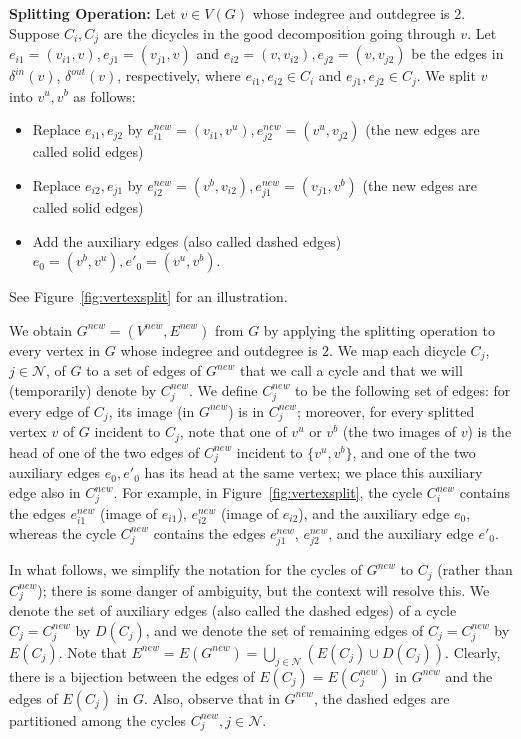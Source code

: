 \documentclass[11pt]{article}
\newcommand{\cindset}{\mathcal{N}}
\begin{document}
\textbf{Splitting Operation:} Let  $v\in V(G)$ whose indegree and
outdegree is $2$. Suppose $C_i, C_j$ are the dicycles in the
good decomposition going through $v$. Let $e_{i1}=(v_{i1}, v),
e_{j1}=(v_{j1}, v)$ and $e_{i2}=(v, v_{i2}), e_{j2}=(v, v_{j2})$
be the edges in $\delta^{in}(v)$, $\delta^{out}(v)$, respectively,
where $e_{i1}, e_{i2}\in C_i$ and $e_{j1}, e_{j2}\in C_j$.  We split
$v$ into $v^{u}, v^{b}$ as follows:

\begin{itemize}
\item Replace $e_{i1}, e_{j2}$ by $e_{i1}^{new}=(v_{i1},v^{u}),
	e_{j2}^{new}=(v^{u}, v_{j2})$ (the new edges are called solid edges)
\item Replace $e_{i2}, e_{j1}$ by $e_{i2}^{new}=(v^{b},v_{i2}),
	e_{j1}^{new}=(v_{j1}, v^{b})$ (the new edges are called solid edges)
\item Add the auxiliary edges (also called dashed edges)
	$e_{0}=(v^{b}, v^{u}), e'_{0}=(v^{u}, v^{b})$.
\end{itemize}

See Figure~\ref{fig:vertexsplit} for an illustration.

We obtain $G^{new}=(V^{new}, E^{new})$ from $G$ by applying the splitting operation to
every vertex in $G$ whose indegree and outdegree is $2$.
We map each dicycle $C_j$, $j\in\cindset$, of $G$
to a set of edges of $G^{new}$ that we call a cycle
and that we will (temporarily) denote by $C_j^{new}$.
We define $C_j^{new}$ to be the following set of edges:
for every edge of $C_j$, its image (in $G^{new}$) is in $C_j^{new}$;
moreover, for every splitted vertex $v$ of $G$ incident to $C_j$,
note that one of $v^{u}$ or $v^{b}$ (the two images of $v$)
is the head of one of the two edges of $C_j^{new}$ incident to $\{v^{u},v^{b}\}$,
and one of the two auxiliary edges $e_{0},e'_{0}$
has its head at the same vertex;
we place this auxiliary edge also in $C_j^{new}$.
For example, in Figure~\ref{fig:vertexsplit},
the cycle $C_i^{new}$ contains the edges
$e_{i1}^{new}$ (image of $e_{i1}$),
$e_{i2}^{new}$ (image of $e_{i2}$), and the auxiliary edge $e_{0}$,
whereas the cycle $C_j^{new}$ contains the edges
$e_{j1}^{new}$, $e_{j2}^{new}$, and
the auxiliary edge $e'_{0}$.

In what follows,
we simplify the notation for the cycles of $G^{new}$
to $C_j$ (rather than $C_j^{new}$);
there is some danger of ambiguity, but the context will resolve this.
We denote the set of auxiliary edges (also called the dashed edges)
of a cycle $C_j=C_j^{new}$ by $D(C_j)$,
and we denote the set of remaining edges of $C_j=C_j^{new}$ by $E(C_j)$.
Note that 
$E^{new} = E(G^{new}) =
\bigcup_{j\in \cindset} (E(C_j) \cup D(C_j))$.
Clearly, there is a bijection between the edges of $E(C_j)=E(C_j^{new})$
in $G^{new}$ and the edges of $E(C_j)$ in $G$.
Also, observe that in $G^{new}$,
the dashed edges are partitioned among the cycles $C_j^{new},j\in\cindset$.
\end{document}
